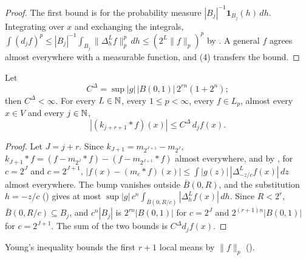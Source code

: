 \begin{proof}
\leanok
The first bound is  for the probability measure
$|B_j|^{-1} \mathbf 1_{B_j}(h) \, dh$. Integrating over $x$ and exchanging the integrals,
$\int (d_j f)^p \leq |B_j|^{-1} \int_{B_j} \|\Delta^L_h f\|_p^p \, dh \leq (2^L \|f\|_p)^p$ by
. A general $f$ agrees almost everywhere with a measurable function, and
 (4) transfers the bound.
\end{proof}

\begin{theorem}
\label{thm:local-means-by-ball-means}
\leanok
{}
Let
\[
  C^\Delta = \sup |g| \, |B(0,1)| \, 2^{rn} (1 + 2^n);
\]
then $C^\Delta < \infty$. For every $L \in \mathbb{N}$, every $1 \leq p < \infty$, every $f \in L_p$,
almost every $x \in V$ and every $j \in \mathbb{N}$,
\[
  |(k_{j+r+1} * f)(x)| \leq C^\Delta \, d_j f(x) .
\]
\end{theorem}

\begin{proof}
\leanok
Let $J = j + r$. Since $k_{J+1} = m_{2^{J+1}} - m_{2^J}$,
$k_{J+1} * f = (f - m_{2^J} * f) - (f - m_{2^{J+1}} * f)$ almost everywhere, and by
, for $c = 2^{J}$ and $c = 2^{J+1}$,
$|f(x) - (m_c * f)(x)| \leq \int |g(z)| \, |\Delta^L_{-z/c} f(x)| \, dz$ almost everywhere. The
bump vanishes outside $\bar B(0, R)$, and the substitution $h = -z/c$
() gives at most $\sup |g| \, c^n \int_{\bar B(0, R/c)}
|\Delta^L_h f(x)| \, dh$. Since $R < 2^r$, $\bar B(0, R/c) \subseteq B_j$, and
$c^n |B_j|$ is $2^{rn} |B(0,1)|$ for $c = 2^J$ and $2^{(r+1)n} |B(0,1)|$ for $c = 2^{J+1}$. The
sum of the two bounds is $C^\Delta d_j f(x)$.
\end{proof}

Young's inequality bounds the first $r + 1$ local means by $\|f\|_p$
().

